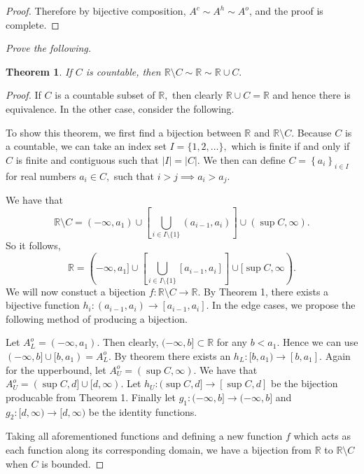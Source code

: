 \documentclass[letter]{article}
\newtheorem{theorem}{Theorem}
\newenvironment{menumerate}{%
  \edef\backupindent{\the\parindent}%
  \enumerate%
  \setlength{\parindent}{\backupindent}%
}{\endenumerate}
\begin{document}
\begin{menumerate}
\begin{menumerate}
\begin{proof}
	 			 	Therefore by bijective composition, $A^c \sim A^h \sim A^o$, and the proof is complete. 

	 			 \end{proof}

 			 \item \textit{Prove the following.} 
 			 	\begin{theorem}
 			 	If $C$ is countable, then $\mathbb{R}\setminus C \sim \mathbb{R} \sim \mathbb{R} \cup C.$
 			 	\end{theorem}
 			 	\begin{proof}
 			 		 If $C$ is a countable subset of $\mathbb{R},$ then clearly $\mathbb{R} \cup C = \mathbb{R}$ and hence there is equivalence. In the other case, consider the following. 

 			 		To show this theorem, we first find a bijection between $\mathbb{R}$ and $\mathbb{R} \setminus C$. Because $C$ is a countable, we can take an index set $I = \{1,2,\dots\},$ which is finite if and only if $C$ is finite and contiguous such that $|I| = |C|.$ We then can define $C = \left\{a_i \right\}_{i \in I}$ for real numbers $a_i \in C,$ such that $i > j \implies a_i > a_j$.

 			 		We have that $$\mathbb{R}\setminus C = (-\infty,a_1)\cup \left[\bigcup_{i\in I \setminus \{1\}}(a_{i-1},a_i)\right]\cup (\sup C,\infty).$$ So it follows,
 			 		 $$\mathbb{R} = (-\infty,a_1]\cup \left[\bigcup_{i\in I \setminus \{1\}}[a_{i-1},a_i]\right]\cup [\sup C,\infty).$$ We will now constuct a bijection $f:\mathbb{R}\setminus C \to \mathbb{R}.$ By Theorem 1, there exists a bijective function $h_i : (a_{i-1}, a_i) \to [a_{i-1}, a_i].$ In the edge cases, we propose the following method of producing a bijection.

 			 		 Let $A_L^o = (-\infty, a_1)$. Then clearly, $(-\infty, b] \subset \mathbb{R}$ for any $b < a_1.$ Hence we can use $(-\infty,b] \cup [b,a_1) = A_L^o.$ By theorem there exists an $h_L:[b,a_1) \to [b,a_1].$ Again for the upperbound, let $A_U^o = (\sup C, \infty).$ We have that $A_U^o = (\sup C, d] \cup [d, \infty)$. Let $h_U : (\sup C, d] \to [\sup C, d]$ be the bijection producable from Theorem 1. Finally let $g_1: (-\infty,b]\to (-\infty,b]$ and $g_2: [d,\infty)\to [d,\infty)$ be the identity functions. 

 			 		 Taking all aforementioned functions and defining a new function $f$ which acts as each function along its corresponding domain, we have a bijection from $\mathbb{R}$ to $\mathbb{R}\setminus C$ when $C$ is bounded. 




\end{proof}
\end{menumerate}
\end{menumerate}
\end{document}
